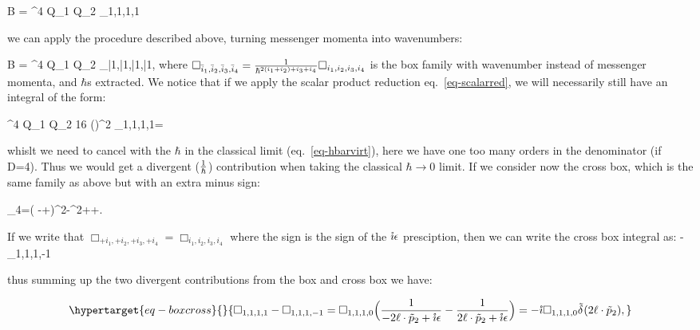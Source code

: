 \documentclass[
  11pt,
  a4paper,
  DIV=11,
  numbers=noendperiod,
  twoside]{scrreprt}
\let\[\relax \let\]\relax %
\DeclareRobustCommand{\[}{\begin{equation}}
\DeclareRobustCommand{\]}{\end{equation}}
\begin{document}
\[
\im B = \elch^4 Q_{1} Q_{2} \int \dn[D]{\ell} \Box_{1,1,1,1}
\]

we can apply the procedure described above, turning messenger momenta
into wavenumbers:

\[
\im B = \elch^4 Q_{1} Q_{2} \int \dn[D]{\bar{\ell}} \Box_{\bar{1},\bar{1},\bar{1},\bar{1}},
\] where
\(\Box_{\bar{i}_1,\bar{i}_2,\bar{i}_3,\bar{i}_4} =\frac{1}{\hbar^{2(i_1+i_2)+i_3+i_4}} \Box_{i_1,i_2,i_3,i_4}\)
is the box family with wavenumber instead of messenger momenta, and
\(\hbar\)s extracted. We notice that if we apply the scalar product
reduction eq.~\ref{eq-scalarred}, we will necessarily still have an
integral of the form:

\[
\elch^4 Q_{1} Q_{2} 16 (\semom[1]\cdot \semom[2])^2 \int \dn[D]{{\ell}}\Box_{1,1,1,1}=\order[D-6]{\hbar}
\]

whislt we need to cancel with the \(\hbar\) in the classical limit
(eq.~\ref{eq-hbarvirt}), here we have one too many orders in the
denominator (if D=4). Thus we would get a divergent (\(\frac{1}{\hbar}\))
contribution when taking the classical \(\hbar\to 0\) limit. If we
consider now the cross box, which is the same family as above but with
an extra minus sign:

\[
\tilde{\rho}_4=( \Half[q] -\ell+\semom[2])^2-\mass[2]^2+\im \epsilon{}\ell\cdot\semom[2]+\im \epsilon.
\]

If we write that \(\Box_{+i_1,+i_2,+i_3,+i_4}=\Box_{i_1,i_2,i_3,i_4}\)
where the sign is the sign of the \(\mathring{\imath}\epsilon\) presciption, then we
can write the cross box integral as: \[
\int \dn[D]{\ell} -\Box_{1,1,1,-1}
\]

thus summing up the two divergent contributions from the box and cross
box we have:

\begin{equation}\protect\hypertarget{eq-boxcross}{}{
\Box_{1,1,1,1}-\Box_{1,1,1,-1}=\Box_{1,1,1,0}\pa[\Big]{\inv{-2\ell\cdot\semom[2]+\im \epsilon}-\inv{    2\ell\cdot\semom[2]+\im \epsilon}}=-\im\Box_{1,1,1,0}\ndeltafn{2\ell\cdot\semom[2]},
}\label{eq-boxcross}\end{equation}
\end{document}
